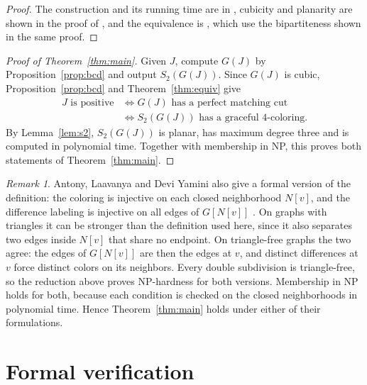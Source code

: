 \documentclass[11pt]{article}
\theoremstyle{remark}
\newtheorem{remark}[theorem]{Remark}
\begin{document}
\begin{proof}
The construction and its running time are in \cite[Section~3.2]{BCD},
cubicity and planarity are shown in the proof of \cite[Lemma~13]{BCD}, and
the equivalence is \cite[Lemmas~26 and~28]{BCD}, which use the bipartiteness
shown in the same proof.
\end{proof}

\begin{proof}[Proof of Theorem~\ref{thm:main}]
Given $J$, compute $G(J)$ by Proposition~\ref{prop:bcd} and output
$S_2(G(J))$. Since $G(J)$ is cubic, Proposition~\ref{prop:bcd} and
Theorem~\ref{thm:equiv} give
\begin{align*}
 J\text{ is positive}
 &\iff G(J)\text{ has a perfect matching cut}\\
 &\iff S_2(G(J))\text{ has a graceful 4-coloring}.
\end{align*}
By Lemma~\ref{lem:s2}, $S_2(G(J))$ is planar, has maximum degree three and is
computed in polynomial time. Together with membership in NP, this proves both
statements of Theorem~\ref{thm:main}.
\end{proof}

\begin{remark}\label{rem:ald}
Antony, Laavanya and Devi Yamini also give a formal version of the definition:
the coloring is injective on each closed neighborhood $N[v]$, and the
difference labeling is injective on all edges of $G[N[v]]$
\cite[Section~1]{ALD}. On graphs with triangles it can be stronger than the
definition used here, since it also separates two edges inside $N[v]$ that
share no endpoint. On triangle-free graphs the two agree: the edges of
$G[N[v]]$ are then the edges at $v$, and distinct differences at $v$ force
distinct colors on its neighbors. Every double subdivision is triangle-free,
so the reduction above proves NP-hardness for both versions. Membership in NP
holds for both, because each condition is checked on the closed neighborhoods
in polynomial time. Hence Theorem~\ref{thm:main} holds under either of their
formulations.
\end{remark}

\section{Formal verification}\label{sec:formal}
\end{document}
